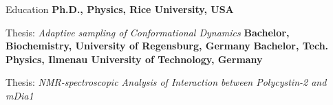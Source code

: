 \begin{rubric}{Education}
%
\entry*[2014 -- 2020]%
	\textbf{Ph.D., Physics, Rice University, USA}
	\par Thesis: \emph{Adaptive sampling of Conformational Dynamics}
%
\entry*[2011 -- 2014]%
	\textbf{Bachelor, Biochemistry, University of Regensburg, Germany} 
%
\entry*[2011 -- 2012]%
  \textbf{Bachelor, Tech. Physics, Ilmenau University of Technology, Germany}
  \par Thesis: \emph{NMR-spectroscopic Analysis of Interaction between Polycystin-2 and mDia1}  
\end{rubric}
